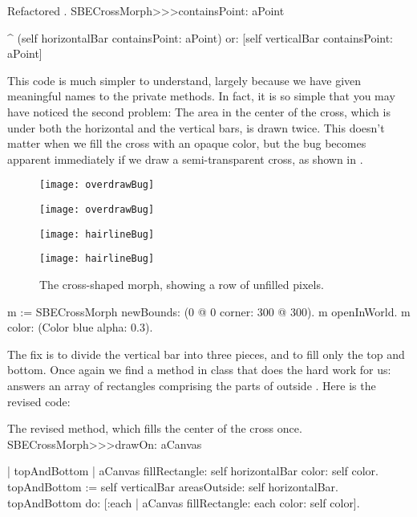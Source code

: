 \documentclass[a4paper,10pt,twoside]{book}
\begin{document}
\begin{method}{Refactored .}
SBECrossMorph>>>containsPoint: aPoint

	^ (self horizontalBar containsPoint: aPoint)
		or: [self verticalBar containsPoint: aPoint]
\end{method}

This code is much simpler to understand, largely because we have given meaningful names to the private methods.
In fact, it is so simple that you may have noticed the second problem:
The area in the center of the cross, which is under both the horizontal and the vertical bars, is drawn twice.  
This doesn't matter when we fill the cross with an opaque color, but the bug becomes apparent immediately if we draw a semi-transparent cross, as shown in .

\begin{figure}[t]
\begin{minipage}[t]{0.48\textwidth}
	\ifluluelse
		{\centerline{\texttt{[image: overdrawBug]}}}
		{\centerline{\texttt{[image: overdrawBug]}}}
	\caption{The center of the cross is filled twice with the color.
		\label{fig:overdrawBug}}
\end{minipage}
\hfill
\begin{minipage}[t]{0.48\textwidth}
	\ifluluelse
		{\centerline{\texttt{[image: hairlineBug]}}}
		{\centerline{\texttt{[image: hairlineBug]}}}
	\caption{The cross-shaped morph, showing a row of unfilled pixels.
		\label{fig:bug}}
\end{minipage}
\end{figure}


\begin{code}{}
m := SBECrossMorph newBounds: (0 @ 0 corner: 300 @ 300).
m openInWorld.
m color: (Color blue alpha: 0.3).
\end{code}

\noindent
The fix is to divide the vertical bar into three pieces, and to fill only the top and bottom.  
Once again we find a method in class  that does the hard work for us:  answers an array of rectangles comprising the parts of  outside .
Here is the revised code:

\begin{method}{The revised  method, which fills the center of the cross once.}
SBECrossMorph>>>drawOn: aCanvas

	| topAndBottom |
	aCanvas fillRectangle: self horizontalBar color: self color.
	topAndBottom := self verticalBar areasOutside: self horizontalBar. 
	topAndBottom do: [:each | aCanvas fillRectangle: each color: self color].
\end{method}
\end{document}
